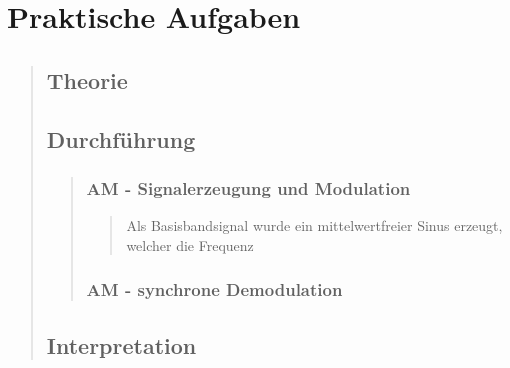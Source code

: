 \section{Praktische Aufgaben}
\begin{quote}
   
   \subsection{Theorie}
   \begin{quote}
   
   \end{quote}
   
   \subsection{Durchführung}
   \begin{quote}
   	
   		\subsubsection{AM - Signalerzeugung und Modulation}
   		\begin{quote}
   			Als Basisbandsignal wurde ein mittelwertfreier Sinus erzeugt, welcher die
   			Frequenz
   		\end{quote}
   		
   		\subsubsection{AM - synchrone Demodulation}
   		\begin{quote}
   		
   		\end{quote}
   \end{quote}
   
   \subsection{Interpretation}
   \begin{quote}
   
   \end{quote}
   
\end{quote}	




